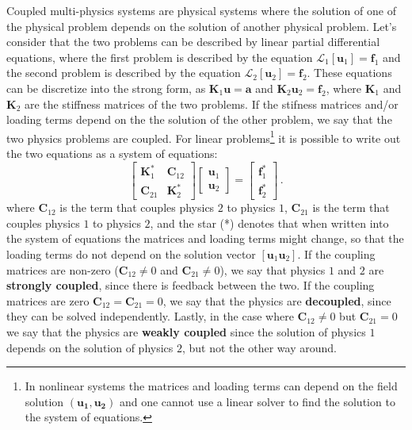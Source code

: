 Coupled multi-physics systems are physical systems where the solution of one of the physical 
problem depends on the solution of another physical problem. Let's consider that the two
problems can be described by linear partial differential equations, where the first problem
is described by the equation $\mathcal{L}_1 [\mathbf{u}_1]= \mathbf{f}_1$ and the second problem is described by the 
equation $\mathcal{L}_2 [\mathbf{u}_2]= \mathbf{f}_2$. These equations can be discretize into the strong form,
as $\mathbf{K}_1 \mathbf{u} = \mathbf{a}$ and $\mathbf{K}_2 \mathbf{u}_2 = \mathbf{f}_2$, where $\mathbf{K}_1$ and $\mathbf{K}_2$ are the stiffness matrices of the two problems.
If the stifness matrices and/or loading terms depend on the the solution of the other problem, we say that the two physics problems are
coupled. For linear problems\footnote{In nonlinear systems the matrices and loading terms can depend on the field solution $(\mathbf{u_1}, \mathbf{u_2})$
and one cannot use a linear solver to find the solution to the system of equations.} it is possible to write out the two equations as a system of equations:
\begin{equation}
    \begin{bmatrix}
        \mathbf{K}^*_1 & \mathbf{C}_{12} \\
        \mathbf{C}_{21} & \mathbf{K}^*_2
    \end{bmatrix}
    \begin{bmatrix}
        \mathbf{u}_1 \\
        \mathbf{u}_2
    \end{bmatrix}
    =
    \begin{bmatrix}
        \mathbf{f}_1^* \\
        \mathbf{f}_2^*
    \end{bmatrix}\,.
\end{equation}
where $\mathbf{C}_{12}$ is the term that couples physics $2$ to physics $1$, $\mathbf{C}_{21}$ is the term that couples physics $1$ to physics $2$, and the star (*) denotes that when written into the system of equations
the matrices and loading terms might change, so that the loading terms do not depend on the solution vector $[\mathbf{u}_1 \mathbf{u}_2]$. If the coupling matrices are non-zero ($\mathbf{C}_{12}\neq 0$ and $\mathbf{C}_{21}\neq 0$), we say that physics $1$ and $2$ are 
\textbf{strongly coupled}, since there is feedback between the two. If the coupling matrices are zero $\mathbf{C}_{12}=\mathbf{C}_{21}=0$, we say that the physics 
are \textbf{decoupled}, since they can be solved independently. Lastly, in the case where $\mathbf{C}_{12}\neq 0$ but $\mathbf{C}_{21} = 0$ we say that the physics are \textbf{weakly
coupled} since the solution of physics $1$ depends on the solution of physics $2$, but not the other way around.

